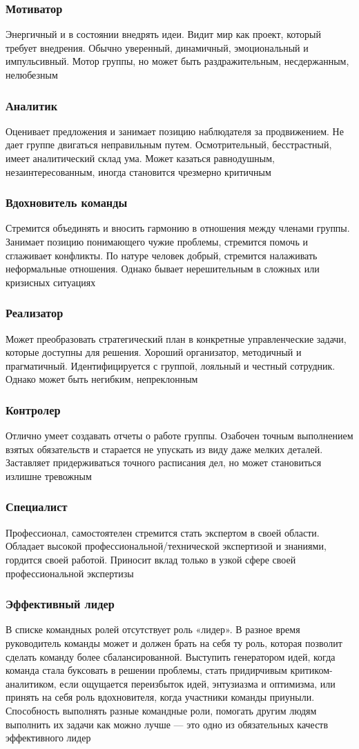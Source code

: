 \documentclass{../industrial-development}
\begin{document}
\begin{frame} \frametitle{Мотиватор}
Энергичный и в состоянии внедрять идеи. Видит мир как проект, который требует внедрения. Обычно уверенный, динамичный, эмоциональный и импульсивный. Мотор группы, но может быть раздражительным, несдержанным, нелюбезным
\end{frame}

\begin{frame} \frametitle{Аналитик}
Оценивает предложения и занимает позицию наблюдателя за продвижением. Не дает группе двигаться неправильным путем. Осмотрительный, бесстрастный, имеет аналитический склад ума. Может казаться равнодушным, незаинтересованным, иногда становится чрезмерно критичным
\end{frame}

\begin{frame} \frametitle{Вдохновитель команды}
Стремится объединять и вносить гармонию в отношения между членами группы. Занимает позицию понимающего чужие проблемы, стремится помочь и сглаживает конфликты. По натуре человек добрый, стремится налаживать неформальные отношения. Однако бывает нерешительным в сложных или кризисных ситуациях
\end{frame}

\begin{frame} \frametitle{Реализатор}
Может преобразовать стратегический план в конкретные управленческие задачи, которые доступны для решения. Хороший организатор, методичный и прагматичный. Идентифицируется с группой, лояльный и честный сотрудник. Однако может быть негибким, непреклонным
\end{frame}

\begin{frame} \frametitle{Контролер}
Отлично умеет создавать отчеты о работе группы. Озабочен точным выполнением взятых обязательств и старается не упускать из виду даже мелких деталей. Заставляет придерживаться точного расписания дел, но может становиться излишне тревожным
\end{frame}

\begin{frame} \frametitle{Специалист}
Профессионал, самостоятелен стремится стать экспертом в своей области. Обладает высокой профессиональной/технической экспертизой и знаниями, гордится своей работой. Приносит вклад только в узкой сфере своей профессиональной экспертизы
\end{frame}

\begin{frame} \frametitle{Эффективный лидер}
В списке командных ролей отсутствует роль «лидер». В разное время руководитель команды может и должен брать на себя ту роль, которая позволит сделать команду более сбалансированной. Выступить генератором идей, когда команда стала буксовать в решении проблемы, стать придирчивым критиком-аналитиком, если ощущается переизбыток идей, энтузиазма и оптимизма, или принять на себя роль вдохновителя, когда участники команды приуныли. Способность выполнять разные командные роли, помогать другим людям выполнить их задачи как можно лучше — это одно из обязательных качеств эффективного лидер
\end{frame}
\end{document}
